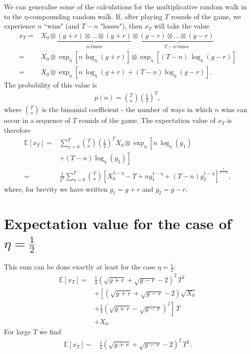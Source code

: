 \documentclass[11pt]{article}
\begin{document}
\begin{multicols}{2}
We can generalise some of the calculations for the multiplicative random walk in \cite{redner1990random} to the $\eta$-compounding random walk.  
If, after playing $T$ rounds of the game, we experience $n$ ``wins" (and $T-n$ "losses"), then $x_T$ will take the value
\begin{align*}
x_T =  &X_0\otimes \underbrace{(g+r)\otimes \ldots \otimes (g+r)}_{n\text{-times}} \otimes \underbrace{(g-r)\otimes \ldots \otimes (g-r)}_{T-n\text{-times}} \\
=& X_0\otimes\exp_\eta\left[n\,\log_\eta(g+r)\right] \otimes \exp_\eta\left[(T-n)\,\log_\eta(g-r) \right]\\
=& X_0\otimes \exp_\eta\left[ n\,\log_\eta(g+r) + (T-n)\log_\eta(g-r) \right].
\end{align*}
The probability of this value is
\begin{align}
\label{eq:binomialDistr}
p(n) = {T \choose n} \left(\frac{1}{2}\right)^T,
\end{align}
where ${T \choose n}$ is the binomial coefficient -  the number of ways in which $n$ wins can occur in a sequence of $T$ rounds of the game.
The expectation value of $x_T$ is therefore
\begin{align}
\nonumber \mathbb{E}\left[x_T \right] =& \sum_{n=0}^T  {T \choose n} \left(\frac{1}{2}\right)^T  X_0\otimes\exp_\eta\left[ n\,\log_\eta(g_1) \right.\\
\nonumber & \left. + (T-n)\log_\eta(g_2) \right]\\
\label{eq-expectationxT}=&   \frac{1}{2^T} \sum_{n=0}^T  {T \choose n} \left[X_0^{1-\eta } -T + n g_1^{1-\eta }+ (T-n) g_2^{1-\eta }\right]^{\frac{1}{1-\eta }},
\end{align}
where, for brevity we have written $g_1 = g+r$ and $g_2 = g-r$.

\section{Expectation value for the case of $\eta=\frac{1}{2}$}
This sum can be done exactly at least for the case $\eta = \frac{1}{2}$:
\begin{align}
\label{eq:expectationExact} \mathbb{E}\left[x_T\right] =& \frac{1}{4}\left(\sqrt{g+r}+\sqrt{g-r}-2\right)^2\,T^2 \\
\nonumber &+ \left[ (\sqrt{g+r}+\sqrt{g-r}-2) \sqrt{X_0} \right.\\
\nonumber & \left.+ \frac{1}{4}(\sqrt{g+r}-\sqrt{g-r})^2\right]\,T\\
\nonumber &+ X_0.
\end{align}
For large  $T$ we find
\begin{align}
\label{eq:ExLargeT}
\mathbb{E}\left[x_T \right]  \sim & \frac{1}{4} \left( \sqrt{g+r} + \sqrt{g-r} -2\right)^2\, T^2.
\end{align}


\end{multicols}
\end{document}
